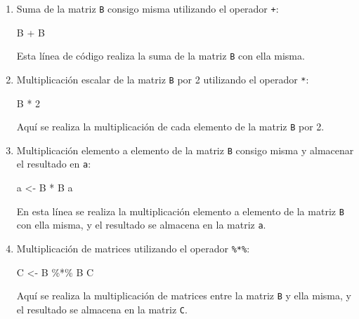 \documentclass[
  jou,
  floatsintext,
  longtable,
  a4paper,
  nolmodern,
  notxfonts,
  notimes,
  12pt,
  colorlinks=true,linkcolor=blue,citecolor=blue,urlcolor=blue]{apa7}
\newenvironment{Shaded}{\begin{snugshade}}{\end{snugshade}}
\newcommand{\DecValTok}[1]{\textcolor[rgb]{0.68,0.00,0.00}{#1}}
\newcommand{\NormalTok}[1]{\textcolor[rgb]{0.00,0.23,0.31}{#1}}
\newcommand{\OtherTok}[1]{\textcolor[rgb]{0.00,0.23,0.31}{#1}}
\newcommand{\SpecialCharTok}[1]{\textcolor[rgb]{0.37,0.37,0.37}{#1}}
\begin{document}
\begin{enumerate}
\def\labelenumi{\arabic{enumi}.}
\item
  Suma de la matriz \texttt{B} consigo misma utilizando el operador
  \texttt{+}:

\begin{Shaded}
\begin{Highlighting}[]
\NormalTok{B }\SpecialCharTok{+}\NormalTok{ B}
\end{Highlighting}
\end{Shaded}

  Esta línea de código realiza la suma de la matriz \texttt{B} con ella
  misma.
\item
  Multiplicación escalar de la matriz \texttt{B} por 2 utilizando el
  operador \texttt{*}:

\begin{Shaded}
\begin{Highlighting}[]
\NormalTok{B }\SpecialCharTok{*} \DecValTok{2}
\end{Highlighting}
\end{Shaded}

  Aquí se realiza la multiplicación de cada elemento de la matriz
  \texttt{B} por 2.
\item
  Multiplicación elemento a elemento de la matriz \texttt{B} consigo
  misma y almacenar el resultado en \texttt{a}:

\begin{Shaded}
\begin{Highlighting}[]
\NormalTok{a }\OtherTok{\textless{}{-}}\NormalTok{ B }\SpecialCharTok{*}\NormalTok{ B}
\NormalTok{a}
\end{Highlighting}
\end{Shaded}

  En esta línea se realiza la multiplicación elemento a elemento de la
  matriz \texttt{B} con ella misma, y el resultado se almacena en la
  matriz \texttt{a}.
\item
  Multiplicación de matrices utilizando el operador \texttt{\%*\%}:

\begin{Shaded}
\begin{Highlighting}[]
\NormalTok{C }\OtherTok{\textless{}{-}}\NormalTok{ B }\SpecialCharTok{\%*\%}\NormalTok{ B}
\NormalTok{C}
\end{Highlighting}
\end{Shaded}

  Aquí se realiza la multiplicación de matrices entre la matriz
  \texttt{B} y ella misma, y el resultado se almacena en la matriz
  \texttt{C}.
\end{enumerate}
\end{document}
